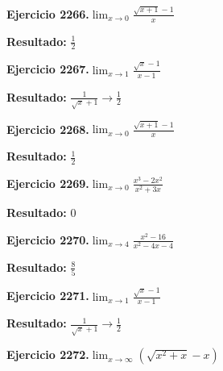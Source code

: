 \documentclass[10pt,a4paper]{article}
\begin{document}
\begin{ejbox}
\textbf{Ejercicio 2266.}\quad $\lim_{x\to 0} \frac{\sqrt{x+1}-1}{x}$
\end{ejbox}

\begin{solbox}
\textbf{Resultado:} \(\displaystyle \frac{1}{2}\)
\end{solbox}

\newpage
\begin{ejbox}
\textbf{Ejercicio 2267.}\quad $\lim_{x\to 1} \frac{\sqrt{x}-1}{x-1}$
\end{ejbox}

\begin{solbox}
\textbf{Resultado:} \(\displaystyle \frac{1}{\sqrt{x}+1} \to \frac{1}{2}\)
\end{solbox}

\begin{ejbox}
\textbf{Ejercicio 2268.}\quad $\lim_{x\to 0} \frac{\sqrt{x+1}-1}{x}$
\end{ejbox}

\begin{solbox}
\textbf{Resultado:} \(\displaystyle \frac{1}{2}\)
\end{solbox}

\begin{ejbox}
\textbf{Ejercicio 2269.}\quad $\lim_{x\to 0} \frac{x^3-2x^2}{x^2+3x}$
\end{ejbox}

\begin{solbox}
\textbf{Resultado:} \(\displaystyle 0\)
\end{solbox}

\newpage
\begin{ejbox}
\textbf{Ejercicio 2270.}\quad $\lim_{x\to 4} \frac{x^2-16}{x^2-4x-4}$
\end{ejbox}

\begin{solbox}
\textbf{Resultado:} \(\displaystyle \frac{8}{5}\)
\end{solbox}

\begin{ejbox}
\textbf{Ejercicio 2271.}\quad $\lim_{x\to 1} \frac{\sqrt{x}-1}{x-1}$
\end{ejbox}

\begin{solbox}
\textbf{Resultado:} \(\displaystyle \frac{1}{\sqrt{x}+1} \to \frac{1}{2}\)
\end{solbox}

\begin{ejbox}
\textbf{Ejercicio 2272.}\quad $\lim_{x\to \infty} (\sqrt{x^2+x} - x)$
\end{ejbox}
\end{document}
